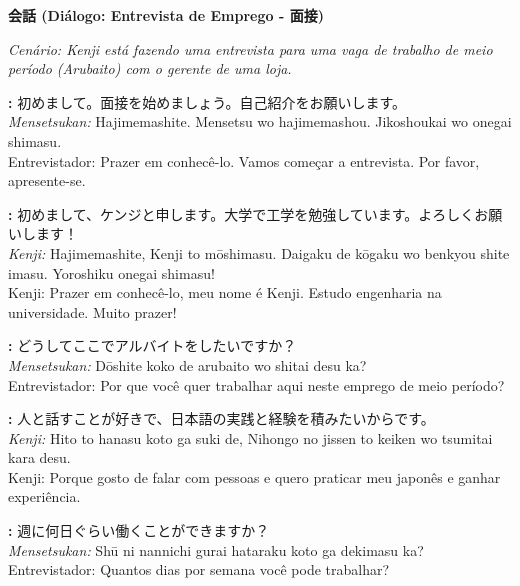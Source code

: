 \documentclass[12pt,a4paper]{article}
\begin{document}
\newpage

\begin{center}
    {\LARGE\bfseries 会話 (Diálogo: Entrevista de Emprego - 面接)}
\end{center}

\textit{Cenário: Kenji está fazendo uma entrevista para uma vaga de trabalho de meio período (\textit{Arubaito}) com o gerente de uma loja.}

\vspace{0.8em}

\textbf{:} 初めまして。面接を始めましょう。自己紹介をお願いします。\\
\textit{Mensetsukan:} Hajimemashite. Mensetsu wo hajimemashou. Jikoshoukai wo onegai shimasu.\\
Entrevistador: Prazer em conhecê-lo. Vamos começar a entrevista. Por favor, apresente-se.

\vspace{0.4em}

\textbf{:} 初めまして、ケンジと申します。大学で工学を勉強しています。よろしくお願いします！\\
\textit{Kenji:} Hajimemashite, Kenji to mōshimasu. Daigaku de kōgaku wo benkyou shite imasu. Yoroshiku onegai shimasu!\\
Kenji: Prazer em conhecê-lo, meu nome é Kenji. Estudo engenharia na universidade. Muito prazer!

\vspace{0.4em}

\textbf{:} どうしてここでアルバイトをしたいですか？\\
\textit{Mensetsukan:} Dōshite koko de arubaito wo shitai desu ka?\\
Entrevistador: Por que você quer trabalhar aqui neste emprego de meio período?

\vspace{0.4em}

\textbf{:} 人と話すことが好きで、日本語の実践と経験を積みたいからです。\\
\textit{Kenji:} Hito to hanasu koto ga suki de, Nihongo no jissen to keiken wo tsumitai kara desu.\\
Kenji: Porque gosto de falar com pessoas e quero praticar meu japonês e ganhar experiência.

\vspace{0.4em}

\textbf{:} 週に何日ぐらい働くことができますか？\\
\textit{Mensetsukan:} Shū ni nannichi gurai hataraku koto ga dekimasu ka?\\
Entrevistador: Quantos dias por semana você pode trabalhar?
\end{document}
